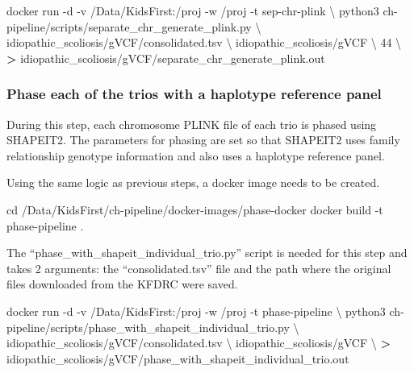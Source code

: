 \documentclass[]{article}
\newenvironment{Shaded}{\begin{snugshade}}{\end{snugshade}}
\newcommand{\BuiltInTok}[1]{#1}
\newcommand{\ExtensionTok}[1]{#1}
\newcommand{\NormalTok}[1]{#1}
\newcommand{\OperatorTok}[1]{\textcolor[rgb]{0.81,0.36,0.00}{\textbf{#1}}}
\begin{document}
\begin{Shaded}
\begin{Highlighting}[]
\ExtensionTok{docker}\NormalTok{ run -d -v /Data/KidsFirst:/proj -w /proj -t sep-chr-plink \textbackslash{}}
\NormalTok{  python3 ch-pipeline/scripts/separate_chr_generate_plink.py \textbackslash{}}
\NormalTok{  idiopathic_scoliosis/gVCF/consolidated.tsv \textbackslash{}}
\NormalTok{  idiopathic_scoliosis/gVCF \textbackslash{}}
\NormalTok{  44 \textbackslash{}}
  \OperatorTok{>}\NormalTok{ idiopathic_scoliosis/gVCF/separate_chr_generate_plink.out}
\end{Highlighting}
\end{Shaded}

\hypertarget{phase-each-of-the-trios-with-a-haplotype-reference-panel}{%
\subsubsection{Phase each of the trios with a haplotype reference
panel}\label{phase-each-of-the-trios-with-a-haplotype-reference-panel}}

During this step, each chromosome PLINK file of each trio is phased
using SHAPEIT2. The parameters for phasing are set so that SHAPEIT2 uses
family relationship genotype information and also uses a haplotype
reference panel.

Using the same logic as previous steps, a docker image needs to be
created.

\begin{Shaded}
\begin{Highlighting}[]
\BuiltInTok{cd}\NormalTok{ /Data/KidsFirst/ch-pipeline/docker-images/phase-docker}
\ExtensionTok{docker}\NormalTok{ build -t phase-pipeline .}
\end{Highlighting}
\end{Shaded}

The ``phase\_with\_shapeit\_individual\_trio.py'' script is needed for
this step and takes 2 arguments: the ``consolidated.tsv'' file and the
path where the original files downloaded from the KFDRC were saved.

\begin{Shaded}
\begin{Highlighting}[]
\ExtensionTok{docker}\NormalTok{ run -d -v /Data/KidsFirst:/proj -w /proj -t phase-pipeline \textbackslash{}}
\NormalTok{  python3 ch-pipeline/scripts/phase_with_shapeit_individual_trio.py \textbackslash{}}
\NormalTok{  idiopathic_scoliosis/gVCF/consolidated.tsv \textbackslash{}}
\NormalTok{  idiopathic_scoliosis/gVCF \textbackslash{}}
  \OperatorTok{>}\NormalTok{ idiopathic_scoliosis/gVCF/phase_with_shapeit_individual_trio.out}
\end{Highlighting}
\end{Shaded}
\end{document}
